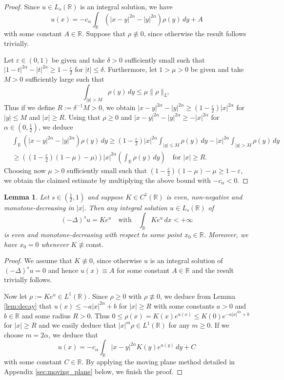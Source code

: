\documentclass[reqno,10pt,a4paper]{amsart}
\newtheorem{lem}{Lemma}[section]
\theoremstyle{definition}
\theoremstyle{definition}
\theoremstyle{remark}
\theoremstyle{remark}
\numberwithin{equation}{section}
\newcommand{\R}{\mathbb{R}}
\newcommand{\eps}{\varepsilon}
\newcommand{\Ds}{(-\Delta)^{s}}
\begin{document}
\begin{proof}
Since $u \in L_s(\R)$ is an integral solution, we have 
$$
u(x) = -c_\alpha \int_{\R} (|x-y|^{2 \alpha} - |y|^{2 \alpha}) \rho(y) \,dy + A 
$$
with some constant $A \in \R$. Suppose that $\rho \not \equiv 0$, since otherwise the result follows trivially.

Let $\eps \in (0,1)$ be given and take $\delta > 0$ sufficiently small such that $|1-t|^{2 \alpha} - |t|^{2 \alpha} \geq 1-\frac{\eps}{2}$ for $|t| \leq \delta$. Furthermore, let $1 > \mu > 0$ be given and take $M> 0$ sufficiently large such that
$$
\int_{|y| > M} \rho(y) \, dy \leq \mu \| \rho \|_{L^1}
$$
Thus if we define $R:=\delta^{-1} M > 0$, we obtain $|x-y|^{2 \alpha} - |y|^{2 \alpha} \geq (1-\frac{\eps}{2}) |x|^{2 \alpha}$ for $|y| \leq M$ and $|x| \geq R$. Using that $\rho \geq 0$ and $|x-y|^{2\alpha} -|y|^{2 \alpha} \geq -|x|^{2 \alpha}$ for $\alpha \in (0, \frac{1}{2})$, we deduce
\begin{align*}
& \int_\R (|x-y|^{2 \alpha}- |y|^{2 \alpha}) \rho(y) \, dy \geq (1-\frac{\eps}{2}) |x|^{2 \alpha} \int_{|y| \leq M} \rho(y) \, dy - |x|^{2 \alpha} \int_{|y| > M} \rho(y) \, dy  \\
& \geq \left ( (1-\frac{\eps}{2}) (1-\mu) - \mu) \right ) |x|^{2 \alpha} \left ( \int_{\R} \rho(y) \,dy  \right ) \quad \mbox{for $|x| \geq R$}.
\end{align*}
Choosing now $\mu > 0$ sufficiently small such that $(1-\frac{\eps}{2})(1-\mu) - \mu \geq 1-\eps$, we obtain the claimed estimate by multiplying the above bound with $-c_\alpha < 0$.
\end{proof}

\begin{lem} \label{lem:symmetry}
Let $s \in (\frac{1}{2}, 1)$ and suppose $K \in C^1(\R)$ is even, non-negative and monotone-decreasing in $|x|$. Then any integral solution $u \in L_s(\R)$ of
$$
\Ds u = K e^u \quad \mbox{with} \quad \int_{\R} K e^u \, dx < +\infty
$$
is even and monotone-decreasing with respect to some point $x_0 \in \R$. Moreover, we have $x_0=0$ whenever $K \not \equiv \mathrm{const.}$
\end{lem}

\begin{proof}
We assume that $K \not \equiv 0$, since otherwise $u$ is an integral solution of $\Ds u = 0$ and hence $u(x) \equiv A$ for some constant $A \in \R$ and the result trivially follows.
  
Now let $\rho := K e^u \in L^1(\R)$. Since $\rho \geq 0$ with $\rho \not \equiv 0$, we deduce from Lemma \ref{lem:decay} that $u(x) \leq -a |x|^{2 \alpha} + b$ for $|x| \geq R$ with some constants $a>0$ and $b \in \R$ and some radius $R >0$. Thus $0\leq \rho(x) = K(x) e^{u(x)} \leq K(0)  e^{-a |x|^{2 \alpha}+b}$ for $|x| \geq R$ and we easily deduce that $|x|^{m} \rho \in L^1(\R)$ for any $m \geq 0$. If we choose $m=2 \alpha$, we deduce that
$$
u(x) = -c_\alpha \int_\R |x-y|^{2 \alpha} K(y) e^{u(y)} \, dy + C
$$
with some constant $C \in \R$. By applying the moving plane method detailed in Appendix \ref{sec:moving_plane} below, we finish the proof.
\end{proof}
\end{document}
